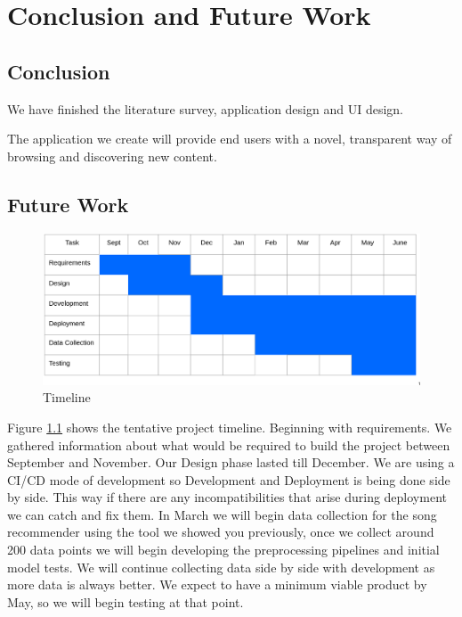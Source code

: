 \documentclass[12pt]{report}
\begin{document}




\chapter{Conclusion and Future Work}
\section{Conclusion}
We have finished the literature survey, application design and UI design. \newline

The application we create will provide end users with a novel, transparent way of browsing and discovering new content.

\section{Future Work}
\begin{figure}[H]
\centering
\includegraphics[width=\textwidth]{imgs/timeline.png}
\caption{Timeline}
\label{fig: timeline}
\end{figure}
Figure \ref{fig: timeline} shows the tentative project timeline. Beginning with requirements. We gathered information about what would be required to build the project between September and November. Our Design phase lasted till December.\newline
We are using a CI/CD mode of development so Development and Deployment is being done side by side. This way if there are any incompatibilities  that arise during deployment we can catch and fix them.\newline
In March we will begin data collection for the song recommender using the tool we showed you previously, once we collect around 200 data points we will begin developing the preprocessing pipelines and initial model tests. We will continue collecting data side by side with development as more data is always better.
We expect to have a minimum viable product by May, so we will begin testing at that point.


\printbibliography
\end{document}

